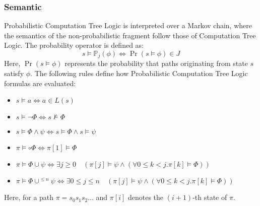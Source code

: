 \subsubsection{Semantic}
Probabilistic Computation Tree Logic is interpreted over a Markov chain, where the semantics of the non-probabilistic fragment follow those of Computation Tree Logic. 
The probability operator is defined as:
\[s\models\mathbb{P}_j(\phi)\Leftrightarrow\Pr(s\models\phi)\in J\]
Here, $\Pr(s\models\phi)$ represents the probability that paths originating from state $s$ satisfy $\phi$. 
The following rules define how Probabilistic Computation Tree Logic formulas are evaluated:
\begin{itemize}
    \item $s \models a \Leftrightarrow a \in L(s)$
    \item $s \models \lnot\Phi \Leftrightarrow s \not\models \Phi$
    \item $s \models \Phi \land \psi \Leftrightarrow s \models \Phi \land s \models \psi$
    \item $\pi \models \circ \Phi \Leftrightarrow \pi[1] \models \Phi$
    \item $\pi \models \Phi \cup \psi \Leftrightarrow \exists j \geq 0 \quad(\pi[j] \models \psi \land (\forall 0 \leq k < j. \pi[k] \models \Phi))$
    \item $\pi \models \Phi \cup^{\leq n} \psi \Leftrightarrow \exists 0 \leq j \leq n \quad(\pi[j] \models \psi \land (\forall 0 \leq k < j. \pi[k] \models \Phi))$
\end{itemize}
Here, for a path $\pi = s_0 s_1 s_2 \dots$ and $\pi[i]$ denotes the $(i+1)$-th state of $\pi$.

